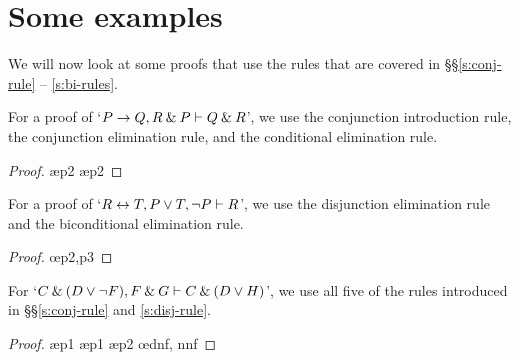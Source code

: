 

\section{Some examples}

We will now look at some proofs that use the rules that are covered in \S\S \ref{s:conj-rule} -- \ref{s:bi-rules}. 

\begin{earg}


\item[\ex{14.6.3}] For a proof of `$P \rightarrow Q, R \mathbin{\&} P \vdash Q \mathbin{\&} R$', we use the conjunction introduction rule, the conjunction elimination rule, and the conditional elimination rule.
\begin{proof}
	 \pr{}
	 \pr{}
	 \ae{p2}
	 \ae{p2}
	 
	 
\end{proof}\medskip

\item[\ex{14.6.4}] For a proof of `$R \leftrightarrow T, P \vee T, {\neg} P \vdash R$', we use the disjunction elimination rule and the biconditional elimination rule.
\begin{proof}
	 \pr{}
	 \pr{}
	 \pr{}
	 \oe{p2,p3}
	 
\end{proof}\medskip

\item[\ex{14.6.2b}] For `$C \mathbin{\&} (D \vee {\neg} F), F \mathbin{\&} G \vdash C \mathbin{\&} (D \vee H)$', we use all five of the rules introduced in \S\S \ref{s:conj-rule} and \ref{s:disj-rule}.
\begin{proof}
	 \pr{}
	 \pr{}
	 \ae{p1}
	 \ae{p1}
	 \ae{p2}
	 
	 \oe{dnf, nnf}
	 
	 
\end{proof}\medskip


\end{earg}
